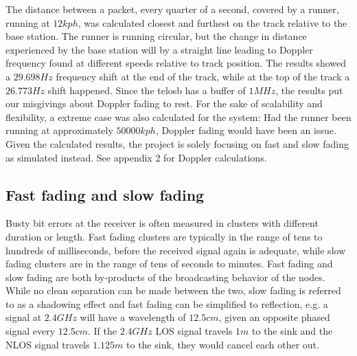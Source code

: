 \noindent The distance between a packet, every quarter of a second, covered by a runner, running at $12kph$, was calculated closest and furthest on the track relative to the base station. The runner is running circular, but the change in distance experienced by the base station will by a straight line leading to Doppler frequency found at different speeds relative to track position. The results showed a $29.698Hz$ frequency shift at the end of the track, while at the top of the track a $26.773Hz$ shift happened. Since the telosb has a buffer of $1MHz$, the results put our misgivings about Doppler fading to rest. For the sake of scalability and flexibility, a extreme case was also calculated for the system: Had the runner been running at approximately $50000kph$, Doppler fading would have been an issue. Given the calculated results, the project is solely focusing on fast and slow fading as simulated instead. See appendix 2 for Doppler calculations.

\subsection{Fast fading and slow fading}%
Busty bit errors at the receiver is often measured in clusters with different duration or length. Fast fading clusters are typically in the range of tens to hundreds of milliseconds, before the received signal again is adequate, while slow fading clusters are in the range of tens of seconds to minutes. Fast fading and slow fading are both by-products of the broadcasting behavior of the nodes. While no clean separation can be made between the two, slow fading is referred to as a shadowing effect and fast fading can be simplified to reflection, e.g. a signal at $2.4GHz$ will have a wavelength of $12.5cm$, given an opposite phased signal every $12.5cm$. If the $2.4GHz$ LOS signal travels $1m$ to the sink and the NLOS signal travels $1.125m$ to the sink, they would cancel each other out.

